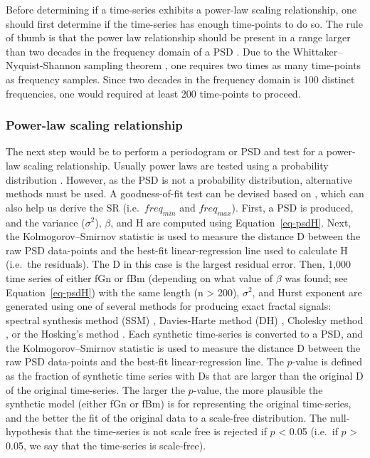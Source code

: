 \documentclass[
  sn-vancouver,
  Numbered,
  referee,
  lineno]{sn-jnl}
\begin{document}
Before determining if a time-series exhibits a power-law scaling
relationship, one should first determine if the time-series has enough
time-points to do so. The rule of thumb is that the power law
relationship should be present in a range larger than two decades in the
frequency domain of a PSD \citep{ekePhysiologicalTimeSeries2000}. Due to
the Whittaker--Nyquist-Shannon sampling theorem
\citep{shannonCommunicationPresenceNoise1949}, one requires two times as
many time-points as frequency samples. Since two decades in the
frequency domain is 100 distinct frequencies, one would required at
least 200 time-points to proceed.

\subsubsection{Power-law scaling
relationship}\label{power-law-scaling-relationship-1}

The next step would be to perform a periodogram or PSD and test for a
power-law scaling relationship. Usually power laws are tested using a
probability distribution
\citep{clausetPowerLawDistributionsEmpirical2009}. However, as the PSD
is not a probability distribution, alternative methods must be used. A
goodness-of-fit test can be devised based on
\citet{clausetPowerLawDistributionsEmpirical2009}, which can also help
us derive the SR (i.e.~\(freq_{min}\) and \(freq_{max}\)). First, a PSD
is produced, and the variance (\(\sigma^2\)), \(\beta\), and H are
computed using Equation~\ref{eq-psdH}. Next, the Kolmogorov--Smirnov
statistic
\citep{kolmogorovSullaDeterminazioneEmpirica1933, smirnovTableEstimatingGoodness1948}
is used to measure the distance D between the raw PSD data-points and
the best-fit linear-regression line used to calculate H (i.e.~the
residuals). The D in this case is the largest residual error. Then,
1,000 time series of either fGn or fBm (depending on what value of
\(\beta\) was found; see Equation~\ref{eq-psdH}) with the same length (n
\textgreater{} 200), \(\sigma^2\), and Hurst exponent are generated
using one of several methods for producing exact fractal signals:
spectral synthesis method (SSM) \citep{peitgenScienceFractalImages1988},
Davies-Harte method (DH) \citep{daviesTestsHurstEffect1987}, Cholesky
method \citep{asmussenStochasticSimulationView1998}, or the Hosking's
method \citep{hoskingModelingPersistenceHydrological1984}. Each
synthetic time-series is converted to a PSD, and the Kolmogorov--Smirnov
statistic is used to measure the distance D between the raw PSD
data-points and the best-fit linear-regression line. The \(p\)-value is
defined as the fraction of synthetic time series with Ds that are larger
than the original D of the original time-series. The larger the
\(p\)-value, the more plausible the synthetic model (either fGn or fBm)
is for representing the original time-series, and the better the fit of
the original data to a scale-free distribution. The null-hypothesis that
the time-series is not scale free is rejected if \(p\) \textless{} 0.05
(i.e.~if \(p\) \textgreater{} 0.05, we say that the time-series is
scale-free).
\end{document}

